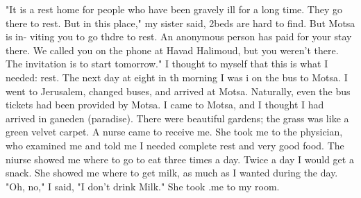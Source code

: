 "It is a rest home for people who have been gravely ill for a long time.
They go there 
to rest.
But in this place," my sister said, 2beds are hard to find.
But Motsa is in-
viting you to go thdre to rest.
An anonymous person has paid for your stay there.
We 
called you on the phone at Havad Halimoud, but you weren't there.
The invitation is to 
start tomorrow."
I thought to myself that this is what I needed: rest.
The next day at eight in th 
morning I was i on the bus to Motsa.
I went to Jerusalem, changed buses, and arrived at 
Motsa.
Naturally, even the bus tickets had been provided by Motsa.
I came to Motsa, 
and I thought I had arrived in ganeden (paradise).
There were beautiful gardens; the 
grass was like a green velvet carpet.
A nurse came to receive me.
She took me to the 
physician, who examined me and told me I needed complete rest and very good food.
The niurse showed me where to go to eat three times a day.
Twice a day I would 
get a snack.
She showed me where to get milk, as much as I wanted during the day.
"Oh, no," I said, "I don't drink Milk."
She took .me to my room.
